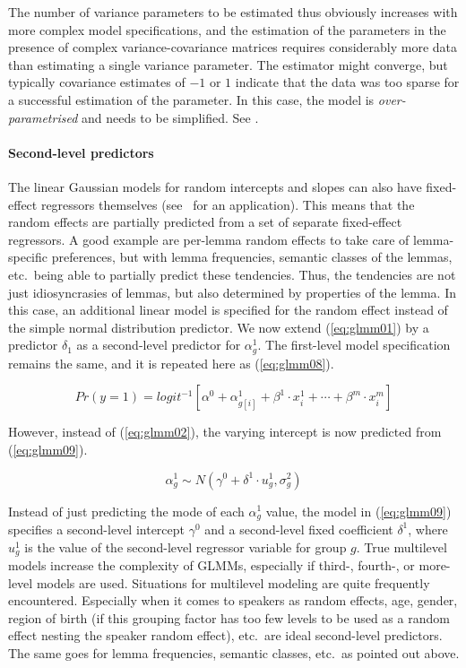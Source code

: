 The number of variance parameters to be estimated thus obviously increases with more complex model specifications, and the estimation of the parameters in the presence of complex variance-covariance matrices requires considerably more data than estimating a single variance parameter.
The estimator might converge, but typically covariance estimates of $-1$ or $1$ indicate that the data was too sparse for a successful estimation of the parameter.
In this case, the model is \textit{over-parametrised} and needs to be simplified.
See \citet{BatesEa2015a,MatuschekEa2017}.

\paragraph{Second-level predictors}

The linear Gaussian models for random intercepts and slopes can also have fixed-effect regressors themselves (see \RAMeasure\ for an application).
This means that the random effects are partially predicted from a set of separate fixed-effect regressors.
A good example are per-lemma random effects to take care of lemma-specific preferences, but with lemma frequencies, semantic classes of the lemmas, etc.\ being able to partially predict these tendencies.
Thus, the tendencies are not just idiosyncrasies of lemmas, but also determined by properties of the lemma.
In this case, an additional linear model is specified for the random effect instead of the simple normal distribution predictor.
We now extend (\ref{eq:glmm01}) by a predictor $\delta_1$ as a second-level predictor for $\alpha^1_g$.
The first-level model specification remains the same, and it is repeated here as (\ref{eq:glmm08}).

\begin{equation}
  Pr(y=1)=logit^{-1}\left[\alpha^0+\alpha^1_{g[i]}+\beta^1\cdot x^1_i+\cdots+\beta^m\cdot x^m_i\right]
  \label{eq:glmm08}
\end{equation}

However, instead of (\ref{eq:glmm02}), the varying intercept is now predicted from (\ref{eq:glmm09}).

\begin{equation}
  \alpha^1_g\sim N(\gamma^0+\delta^1\cdot u^1_g,\sigma_g^2)
  \label{eq:glmm09}
\end{equation}

Instead of just predicting the mode of each $\alpha^1_g$ value, the model in (\ref{eq:glmm09}) specifies a second-level intercept $\gamma^0$ and a second-level fixed coefficient $\delta^1$, where $u^1_g$ is the value of the second-level regressor variable for group $g$.
True multilevel models increase the complexity of GLMMs, especially if third-, fourth-, or more-level models are used.
Situations for multilevel modeling are quite frequently encountered.
Especially when it comes to speakers as random effects, age, gender, region of birth (if this grouping factor has too few levels to be used as a random effect nesting the speaker random effect), etc.\ are ideal second-level predictors.
The same goes for lemma frequencies, semantic classes, etc.\ as pointed out above.

